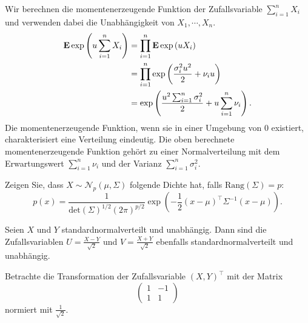 \solution
Wir berechnen die momentenerzeugende Funktion der Zufallsvariable $\sum_{i=1}^{n} X_i$
und verwenden dabei die Unabhängigkeit von $X_1, \cdots, X_n$.
\begin{align*}
    \mathbf{E} \exp \left( u \sum_{i=1}^{n} X_i \right) 
    &= \prod_{i=1}^{n} \mathbf{E} \exp \left( u X_i \right) \\
    &= \prod_{i=1}^n \exp \left( \frac{\sigma_i^2 u^2 }{2} + \nu_i u \right) \\
    &= \exp \left( \frac{ u^2 \sum_{i=1}^{n} \sigma_i^2 }{2} + u \sum_{i=1}^{n} \nu_i \right).
\end{align*}
Die momentenerzeugende Funktion, wenn sie in einer Umgebung von $0$ existiert, 
charakterisiert eine Verteilung eindeutig. Die oben berechnete momentenerzeugende Funktion
gehört zu einer Normalverteilung mit dem Erwartungswert $\sum_{i=1}^{n} \nu_i$ und
der Varianz $\sum_{i=1}^{n} \sigma^2_i$. 


 Zeigen Sie, dass 
$X \sim \mathcal N_p\left( \mu, \Sigma \right) $ folgende Dichte hat, falls 
$\textrm{Rang}(\Sigma)=p$: 
\begin{equation*}
    p(x) = \frac{1}{ \textrm{det}(\Sigma)^{1/2} (2\pi)^{p/2}} \exp\left( - \frac{1}{2} (x  - \mu)^\top \Sigma^{-1} (x - \mu) \right).
\end{equation*} %


 Seien $X$ und $Y$
standardnormalverteilt und unabhängig. Dann sind die Zufallsvariablen $U =
\frac{X-Y}{\sqrt{2}}$ und $V=\frac{X+Y}{\sqrt{2}}$ ebenfalls standardnormalverteilt 
und unabhängig. 

\solution Betrachte die Transformation der Zufallsvariable $(X,Y)^\top$
mit der Matrix
\begin{equation*}
    \begin{pmatrix}
        1 & -1 \\ 1 & 1 
    \end{pmatrix}
\end{equation*}
normiert mit $\frac{1}{\sqrt{2}}$. 


